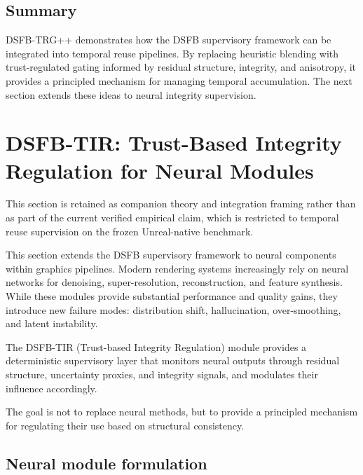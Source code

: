 \documentclass[11pt]{article}
\theoremstyle{definition}
\theoremstyle{plain}
\begin{document}

\subsection{Summary}

DSFB-TRG++ demonstrates how the DSFB supervisory framework can be integrated into temporal reuse pipelines. By replacing heuristic blending with trust-regulated gating informed by residual structure, integrity, and anisotropy, it provides a principled mechanism for managing temporal accumulation. The next section extends these ideas to neural integrity supervision.




\section{DSFB-TIR: Trust-Based Integrity Regulation for Neural Modules}

This section is retained as companion theory and integration framing rather than as part of the current verified empirical claim, which is restricted to temporal reuse supervision on the frozen Unreal-native benchmark.
\label{sec:tir}

This section extends the DSFB supervisory framework to neural components within graphics pipelines. Modern rendering systems increasingly rely on neural networks for denoising, super-resolution, reconstruction, and feature synthesis. While these modules provide substantial performance and quality gains, they introduce new failure modes: distribution shift, hallucination, over-smoothing, and latent instability.

The DSFB-TIR (Trust-based Integrity Regulation) module provides a deterministic supervisory layer that monitors neural outputs through residual structure, uncertainty proxies, and integrity signals, and modulates their influence accordingly.

The goal is not to replace neural methods, but to provide a principled mechanism for regulating their use based on structural consistency.


\subsection{Neural module formulation}
\end{document}
